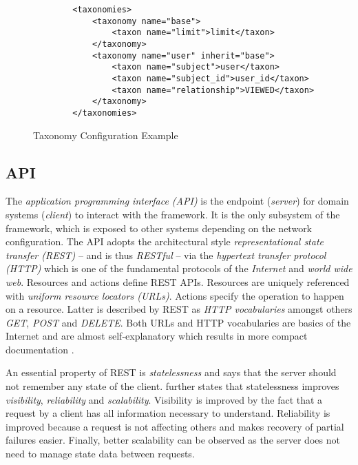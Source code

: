 \begin{figure}[ht]
    \begin{verbatim}
        <taxonomies>
            <taxonomy name="base">
                <taxon name="limit">limit</taxon>
            </taxonomy>
            <taxonomy name="user" inherit="base">
                <taxon name="subject">user</taxon>
                <taxon name="subject_id">user_id</taxon>
                <taxon name="relationship">VIEWED</taxon>
            </taxonomy>
        </taxonomies>
    \end{verbatim}
    \caption{Taxonomy Configuration Example}
    \label{fig:architecture-framework-taxonomy}
\end{figure}

\subsection{API}

The \emph{application programming interface (API)} is the endpoint (\emph{server}) for domain systems (\emph{client}) to interact with the framework. It is the only subsystem of the framework, which is exposed to other systems depending on the network configuration. The API adopts the architectural style \emph{representational state transfer (REST)} -- and is thus \emph{RESTful} -- via the \emph{hypertext transfer protocol (HTTP)} which is one of the fundamental protocols of the \emph{Internet} and \emph{world wide web}. Resources and actions define REST APIs. Resources are uniquely referenced with \emph{uniform resource locators (URLs)}. Actions specify the operation to happen on a resource. Latter is described by REST as \emph{HTTP vocabularies} amongst others \emph{GET}, \emph{POST} and \emph{DELETE}. Both URLs and HTTP vocabularies are basics of the Internet and are almost self-explanatory which results in more compact documentation \cite{fielding00}.

An essential property of REST is \emph{statelessness} and says that the server should not remember any state of the client. \citet{fielding00} further states that statelessness improves \emph{visibility}, \emph{reliability} and \emph{scalability}. Visibility is improved by the fact that a  request by a client has all information necessary to understand. Reliability is improved because a request is not affecting others and makes recovery of partial failures easier. Finally, better scalability can be observed as the server does not need to manage state data between requests.

